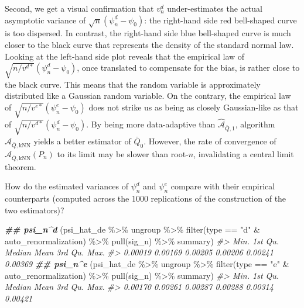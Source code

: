 \documentclass[
  11pt,
  openright,twoside]{book}
\newenvironment{Shaded}{\begin{snugshade}}{\end{snugshade}}
\newcommand{\CommentTok}[1]{\textcolor[rgb]{0.56,0.35,0.01}{\textit{#1}}}
\newcommand{\DocumentationTok}[1]{\textcolor[rgb]{0.56,0.35,0.01}{\textbf{\textit{#1}}}}
\newcommand{\FunctionTok}[1]{\textcolor[rgb]{0.00,0.00,0.00}{#1}}
\newcommand{\NormalTok}[1]{#1}
\newcommand{\SpecialCharTok}[1]{\textcolor[rgb]{0.00,0.00,0.00}{#1}}
\newcommand{\StringTok}[1]{\textcolor[rgb]{0.31,0.60,0.02}{#1}}
\newcommand{\Algo}{\widehat{\mathcal{A}}}
\newcommand{\Qbar}{\bar{Q}}
\theoremstyle{definition}
\theoremstyle{definition}
\theoremstyle{definition}
\theoremstyle{definition}
\theoremstyle{remark}
\begin{document}
Second, we get a visual confirmation that \(v_{n}^{d}\) under-estimates the
actual asymptotic variance of \(\sqrt{n} (\psi_{n}^{d} - \psi_{0})\): the
right-hand side red bell-shaped curve is too dispersed. In contrast, the
right-hand side blue bell-shaped curve is much closer to the black curve that
represents the density of the standard normal law. Looking at the left-hand
side plot reveals that the empirical law of \(\sqrt{n/v^{d*}} (\psi_{n}^{d} - \psi_{0})\), once translated to compensate for the bias, is rather close to the
black curve. This means that the random variable is approximately distributed
like a Gaussian random variable. On the contrary, the empirical law of
\(\sqrt{n/v^{e*}} (\psi_{n}^{e} - \psi_{0})\) does not strike us as being as
closely Gaussian-like as that of \(\sqrt{n/v^{d*}} (\psi_{n}^{d} - \psi_{0})\).
By being more data-adaptive than \(\Algo_{\Qbar,1}\), algorithm
\(\Algo_{\Qbar,\text{kNN}}\) yields a better estimator of \(\Qbar_{0}\). However,
the rate of convergence of \(\Algo_{\Qbar,\text{kNN}}(P_{n})\) to its limit may
be slower than root-\(n\), invalidating a central limit theorem.

How do the estimated variances of \(\psi_{n}^{d}\) and \(\psi_{n}^{e}\) compare
with their empirical counterparts (computed across the 1000 replications of
the construction of the two estimators)?

\begin{Shaded}
\begin{Highlighting}[]
\DocumentationTok{\#\# psi\_n\^{}d}
\NormalTok{(psi\_hat\_de }\SpecialCharTok{\%\textgreater{}\%}\NormalTok{ ungroup }\SpecialCharTok{\%\textgreater{}\%}
   \FunctionTok{filter}\NormalTok{(type }\SpecialCharTok{==} \StringTok{"d"} \SpecialCharTok{\&}\NormalTok{ auto\_renormalization) }\SpecialCharTok{\%\textgreater{}\%} \FunctionTok{pull}\NormalTok{(sig\_n) }\SpecialCharTok{\%\textgreater{}\%}\NormalTok{ summary)}
\CommentTok{\#\textgreater{}    Min. 1st Qu.  Median    Mean 3rd Qu.    Max. }
\CommentTok{\#\textgreater{} 0.00019 0.00169 0.00205 0.00206 0.00241 0.00369}
\DocumentationTok{\#\# psi\_n\^{}e}
\NormalTok{(psi\_hat\_de }\SpecialCharTok{\%\textgreater{}\%}\NormalTok{ ungroup }\SpecialCharTok{\%\textgreater{}\%}
   \FunctionTok{filter}\NormalTok{(type }\SpecialCharTok{==} \StringTok{"e"} \SpecialCharTok{\&}\NormalTok{ auto\_renormalization) }\SpecialCharTok{\%\textgreater{}\%} \FunctionTok{pull}\NormalTok{(sig\_n) }\SpecialCharTok{\%\textgreater{}\%}\NormalTok{ summary)}
\CommentTok{\#\textgreater{}    Min. 1st Qu.  Median    Mean 3rd Qu.    Max. }
\CommentTok{\#\textgreater{} 0.00170 0.00261 0.00287 0.00288 0.00314 0.00421}
\end{Highlighting}
\end{Shaded}
\end{document}
